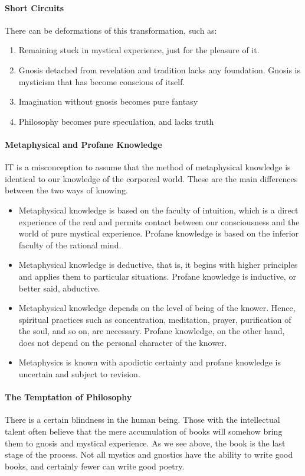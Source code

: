 \paragraph{Short Circuits}
There can be deformations of this transformation, such as:

\begin{enumerate}
\item Remaining stuck in mystical experience, just for the pleasure of it. 
\item Gnosis detached from revelation and tradition lacks any foundation. Gnosis is mysticism that has become conscious of itself. 
\item Imagination without gnosis becomes pure fantasy 
\item Philosophy becomes pure speculation, and lacks truth 
\end{enumerate}
\paragraph{Metaphysical and Profane Knowledge}
IT is a misconception to assume that the method of metaphysical knowledge is identical to our knowledge of the corporeal world. These are the main differences between the two ways of knowing.

\begin{itemize}
\item Metaphysical knowledge is based on the faculty of intuition, which is a direct experience of the real and permits contact between our consciousness and the world of pure mystical experience. Profane knowledge is based on the inferior faculty of the rational mind. 
\item Metaphysical knowledge is deductive, that is, it begins with higher principles and applies them to particular situations. Profane knowledge is inductive, or better said, abductive. 
\item Metaphysical knowledge depends on the level of being of the knower. Hence, spiritual practices such as concentration, meditation, prayer, purification of the soul, and so on, are necessary. Profane knowledge, on the other hand, does not depend on the personal character of the knower. 
\item Metaphysics is known with apodictic certainty and profane knowledge is uncertain and subject to revision. 
\end{itemize}
\paragraph{The Temptation of Philosophy}
There is a certain blindness in the human being. Those with the intellectual talent often believe that the mere accumulation of books will somehow bring them to gnosis and mystical experience. As we see above, the book is the last stage of the process. Not all mystics and gnostics have the ability to write good books, and certainly fewer can write good poetry.

